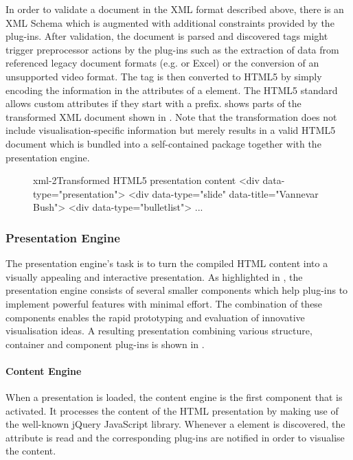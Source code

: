      In order to validate a \mxp document in the XML format described above,
     there is an XML Schema which is augmented with additional constraints
     provided by the plug-ins. After validation, the document is parsed and
     discovered tags might trigger preprocessor actions by the plug-ins such as
     the extraction of data from referenced legacy document formats (e.g. \ppt
     or Excel) or the conversion of an unsupported video format. The tag is
     then converted to HTML5 by simply encoding the information in the
     attributes of a  element. The HTML5 standard allows custom
     attributes if they start with a  prefix.  shows
     parts of the transformed XML document shown in . Note that
     the transformation does not include visualisation-specific information but
     merely results in a valid HTML5 document which is bundled into a
     self-contained package together with the presentation engine.

     \begin{figure}[h!]
      \begin{lstxml}{xml-2}{Transformed HTML5 presentation content}
<div data-type="presentation">
  <div data-type="slide" data-title="Vannevar Bush">
    <div data-type="bulletlist">
      ...
      \end{lstxml}
     \end{figure}

    \subsubsection{Presentation Engine}

     The presentation engine's task is to turn the compiled HTML content into a
     visually appealing and interactive presentation. As highlighted in
     , the presentation engine consists of several
     smaller components which help plug-ins to implement powerful features with
     minimal effort. The combination of these components enables the rapid
     prototyping and evaluation of innovative visualisation ideas. A resulting
     \mxp presentation combining various structure, container and component
     plug-ins is shown in .


     \paragraph{Content Engine} When a presentation is loaded, the content
      engine is the first component that is activated. It processes the content
      of the HTML presentation by making use of the well-known jQuery
      JavaScript library. Whenever a  element is discovered, the
       attribute is read and the corresponding plug-ins are
      notified in order to visualise the content.

